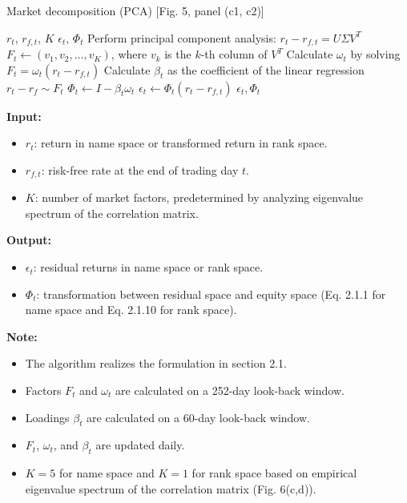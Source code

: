 \documentclass[12pt,article]{memoir}
\begin{document}
\begin{algorithm}[H]
    \caption{Market decomposition (PCA) [Fig. 5, panel (c1, c2)]}
    \begin{algorithmic}[1]
        \Require $r_t$, $r_{f, t}$, $K$
        \Ensure $\epsilon_t$, $\Phi_t$
            \State Perform principal component analysis: $r_t - r_{f, t} = U \Sigma V^T$
            \State $F_t \gets (v_1, v_2, \ldots, v_K)$, where $v_k$ is the $k$-th column of $V^T$
            \State Calculate $\omega_t$ by solving $F_t = \omega_t (r_t - r_{f,t})$
            \State Calculate $\beta_t$ as the coefficient of the linear regression $r_t - r_f \sim F_t$
            \State $\Phi_t \gets I - \beta_t \omega_t$
            \State $\epsilon_t \gets \Phi_t (r_t - r_{f, t})$
            \State \Return $\epsilon_t, \Phi_t$
        \EndFunction
    \end{algorithmic}
\end{algorithm}

\textbf{Input:}
\begin{itemize}
    \item $r_t$: return in name space or transformed return in rank space.
    \item $r_{f, t}$: risk-free rate at the end of trading day $t$.
    \item $K$: number of market factors, predetermined by analyzing eigenvalue spectrum of the correlation matrix.
\end{itemize}

\textbf{Output:}
\begin{itemize}
    \item $\epsilon_t$: residual returns in name space or rank space.
    \item $\Phi_t$: transformation between residual space and equity space (Eq. 2.1.1 for name space and Eq. 2.1.10 for rank space).
\end{itemize}

\textbf{Note:}
\begin{itemize}
    \item The algorithm realizes the formulation in section 2.1.
    \item Factors $F_t$ and $\omega_t$ are calculated on a 252-day look-back window.
    \item Loadings $\beta_t$ are calculated on a 60-day look-back window.
    \item $F_t$, $\omega_t$, and $\beta_t$ are updated daily.
    \item $K=5$ for name space and $K=1$ for rank space based on empirical eigenvalue spectrum of the correlation matrix (Fig. 6(c,d)).
\end{itemize}
\end{document}
